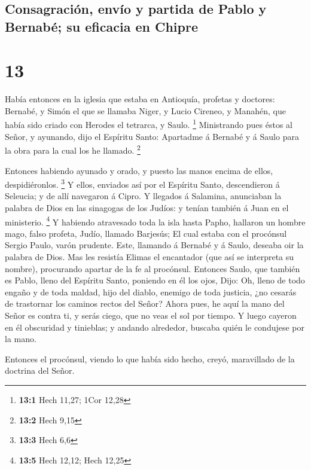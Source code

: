 \hypertarget{consagraciuxf3n-envuxedo-y-partida-de-pablo-y-bernabuxe9-su-eficacia-en-chipre}{%
\subsection{Consagración, envío y partida de Pablo y Bernabé; su
eficacia en
Chipre}\label{consagraciuxf3n-envuxedo-y-partida-de-pablo-y-bernabuxe9-su-eficacia-en-chipre}}

\hypertarget{section-12}{%
\section{13}\label{section-12}}

 Había entonces en la iglesia que estaba en Antioquía,
profetas y doctores: Bernabé, y Simón el que se llamaba Niger, y Lucio
Cireneo, y Manahén, que había sido criado con Herodes el tetrarca, y
Saulo. \footnote{\textbf{13:1} Hech 11,27; 1Cor 12,28} 
Ministrando pues éstos al Señor, y ayunando, dijo el Espíritu Santo:
Apartadme á Bernabé y á Saulo para la obra para la cual los he llamado.
\footnote{\textbf{13:2} Hech 9,15}

 Entonces habiendo ayunado y orado, y puesto las manos
encima de ellos, despidiéronlos. \footnote{\textbf{13:3} Hech 6,6}
 Y ellos, enviados así por el Espíritu Santo, descendieron á
Seleucia; y de allí navegaron á Cipro.  Y llegados á
Salamina, anunciaban la palabra de Dios en las sinagogas de los Judíos:
y tenían también á Juan en el ministerio. \footnote{\textbf{13:5} Hech
  12,12; Hech 12,25}  Y habiendo atravesado toda la isla
hasta Papho, hallaron un hombre mago, falso profeta, Judío, llamado
Barjesús;  El cual estaba con el procónsul Sergio Paulo,
varón prudente. Este, llamando á Bernabé y á Saulo, deseaba oir la
palabra de Dios.  Mas les resistía Elimas el encantador (que
así se interpreta su nombre), procurando apartar de la fe al procónsul.
 Entonces Saulo, que también es Pablo, lleno del Espíritu
Santo, poniendo en él los ojos,  Dijo: Oh, lleno de todo
engaño y de toda maldad, hijo del diablo, enemigo de toda justicia, ¿no
cesarás de trastornar los caminos rectos del Señor?  Ahora
pues, he aquí la mano del Señor es contra ti, y serás ciego, que no veas
el sol por tiempo. Y luego cayeron en él obscuridad y tinieblas; y
andando alrededor, buscaba quién le condujese por la mano.

 Entonces el procónsul, viendo lo que había sido hecho,
creyó, maravillado de la doctrina del Señor.

